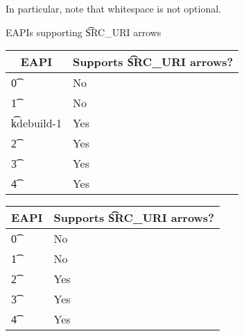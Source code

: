 In particular, note that whitespace is not optional.

\begin{centertable}{EAPIs supporting \t{SRC\_URI} arrows} \label{tab:uri-arrows-table}
\IFKDEBUILDELSE
{
    \begin{tabular}{ l l }
        \toprule
        \multicolumn{1}{c}{\textbf{EAPI}} &
        \multicolumn{1}{c}{\textbf{Supports \t{SRC\_URI} arrows?}} \\
        \midrule
    \t{0} & No \\
    \t{1} & No \\
    \t{kdebuild-1} & Yes \\
    \t{2} & Yes \\
    \t{3} & Yes \\
    \t{4} & Yes \\
    \bottomrule
    \end{tabular}
}{
    \begin{tabular}{ l l }
        \toprule
        \multicolumn{1}{c}{\textbf{EAPI}} &
        \multicolumn{1}{c}{\textbf{Supports \t{SRC\_URI} arrows?}} \\
        \midrule
    \t{0} & No \\
    \t{1} & No \\
    \t{2} & Yes \\
    \t{3} & Yes \\
    \t{4} & Yes \\
    \bottomrule
    \end{tabular}
}
\end{centertable}

